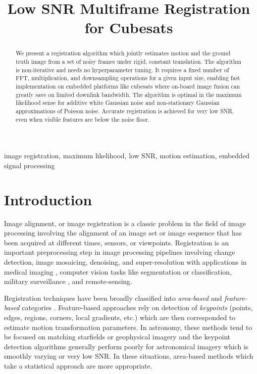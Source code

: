 \documentclass{article}
\title{Low SNR Multiframe Registration for Cubesats}
\begin{document}
\maketitle
\begin{abstract}
  We present a registration algorithm which jointly estimates motion and the ground truth image from a set of noisy frames under rigid, constant translation. The algorithm is non-iterative and needs no hyperparameter tuning.  It requires a fixed number of FFT, multiplication, and downsampling operations for a given input size, enabling fast implementation on embedded platforms like cubesats where on-board image fusion can greatly save on limited downlink bandwidth.  The algorithm is optimal in the maximum likelihood sense for additive white Gaussian noise and non-stationary Gaussian approximations of Poisson noise.  Accurate registration is achieved for very low SNR, even when visible features are below the noise floor.
\end{abstract}

\begin{keywords}
  image registration, maximum likelihood, low SNR, motion estimation, embedded signal processing
\end{keywords}

\section{Introduction}
\label{sec:introduction}

Image alignment, or image registration is a classic problem in the field of image processing involving the alignment of an image set or image sequence that has been acquired at different times, sensors, or viewpoints.
Registration is an important preprocessing step in image processing pipelines involving change detection, image mosaicing, denoising, and super-resolution with applications in medical imaging \cite{wells1996multi}, computer vision tasks \cite{mers} like segmentation or classification, military surveillance \cite{konrad}, and remote-sensing.


Registration techniques have been broadly classified into \emph{area-based} and \emph{feature-based} categories \cite{zitova2003image} \cite{brown1992survey}.  Feature-based approaches rely on detection of \emph{keypoints} (points, edges, regions, corners, local gradients, etc.) which are then corresponded to estimate motion transformation parameters.  In astronomy, these methods tend to be focused on matching starfields \cite{beroiz2020astroalign} \cite{lang2010astrometry} or geophysical imagery \cite{ma2010fully} and the keypoint detection algorithms generally perform poorly for astronomical imagery which is smoothly varying or very low SNR.  In these situations, area-based methods which take a statistical approach are more appropriate.
\end{document}
